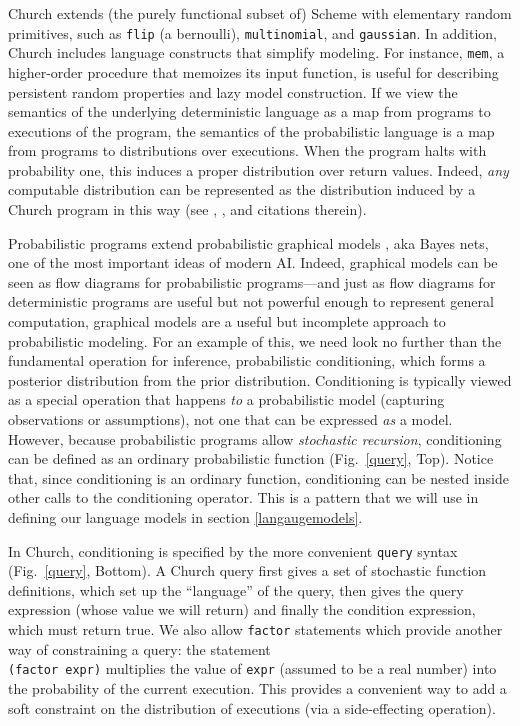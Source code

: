 \documentclass[12pt]{article}
\newcounter{definition}
\begin{document}
Church extends (the purely functional subset of) Scheme \cite{Abelson1996} with elementary random primitives, such as \lstinline{flip} (a bernoulli), \lstinline{multinomial}, and \lstinline{gaussian}. In addition, Church includes language constructs that simplify modeling. For instance, \lstinline{mem}, a higher-order procedure that memoizes its input function, is useful for describing persistent random properties and lazy model construction. %
If we view the semantics of the underlying deterministic language as a map from programs to executions of the program, the semantics of the probabilistic language is a map from programs to distributions over executions. When the program halts with probability one, this induces a proper distribution over return values. Indeed, \emph{any} computable distribution can be represented as the distribution induced by a Church program in this way (see \cite[\S6]{Freer2012}, \cite[\S11]{ackerman2011}, and citations therein).

Probabilistic programs extend probabilistic graphical models \cite{koller2009}, aka Bayes nets, one of the most important ideas of modern AI. Indeed, graphical models can be seen as flow diagrams for probabilistic programs---and just as flow diagrams for deterministic programs are useful but not powerful enough to represent general computation, graphical models are a useful but incomplete approach to probabilistic modeling. For an example of this, we need look no further than the fundamental operation for inference, probabilistic conditioning, which forms a posterior distribution from the prior distribution. Conditioning is typically viewed as a special operation that happens \emph{to} a probabilistic model (capturing observations or assumptions), not one that can be expressed \emph{as} a model. However, because probabilistic programs allow \emph{stochastic recursion}, conditioning can be defined as an ordinary probabilistic function (Fig.~\ref{query}, Top). 
Notice that, since conditioning is an ordinary function, conditioning can be nested inside other calls to the conditioning operator. This is a pattern that we will use in defining our language models in section \ref{langaugemodels}.

In Church, conditioning is specified by the more convenient \lstinline{query} syntax (Fig.~\ref{query}, Bottom). A Church query first gives a set of stochastic function definitions, which set up the ``language'' of the query, then gives the query expression (whose value we will return) and finally the condition expression, which must return true. We also allow \lstinline{factor} statements which provide another way of constraining a query: the statement\\ \lstinline{(factor expr)} multiplies the value of \lstinline{expr} (assumed to be a real number) into the probability of the current execution. This provides a convenient way to add a soft constraint on the distribution of executions (via a side-effecting operation).
\end{document}
